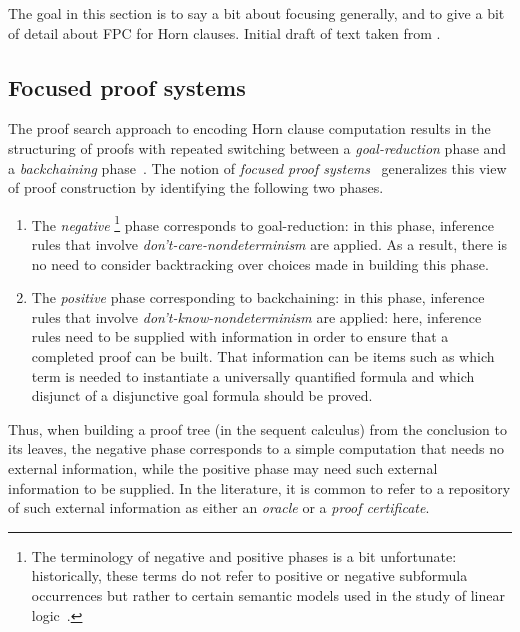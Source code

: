 \documentclass[a4paper,USenglish,cleveref, autoref, thm-restate]{lipics-v2019}
\begin{document}
{\color{red} The goal in this section is to say a bit about focusing
  generally, and to give a bit of detail about FPC for Horn clauses.
  Initial draft of text taken from \cite{blanco19ppdp}.
}

\subsection{Focused proof systems}
\label{ssec:focused}

The proof search approach to encoding Horn clause computation
results in the structuring of proofs with repeated
switching between a \emph{goal-reduction} phase and a
\emph{backchaining} phase~\cite{miller91apal}.
%
The notion of \emph{focused proof systems}~\cite{andreoli92jlc,liang09tcs}
generalizes this view of proof construction by identifying the
following two phases. %
\begin{enumerate}
\item The \emph{negative}%
\footnote{The terminology of negative and positive phases is a bit
  unfortunate: historically, these terms do not refer to positive or negative
  subformula occurrences but rather to certain semantic models used in
  the study of linear logic~\cite{girard87tcs}.}
%
  phase corresponds to  goal-reduction: in this phase,
  inference rules that involve \emph{don't-care-non\-de\-ter\-min\-ism} are
  applied.
%
  As a result, there is no need to consider backtracking over choices
  made in building this phase.

\item The \emph{positive} phase corresponding to  backchaining: in this phase, inference rules that involve
  \emph{don't-know-non\-de\-ter\-min\-ism} are applied: here,
  inference rules need to be supplied with information in order to
  ensure that a completed proof can be built.
%
  That information can be items such as which term is needed to
  instantiate a universally quantified formula and which disjunct of a
  disjunctive goal formula should be proved.
\end{enumerate}
%
Thus, when building a proof tree (in the sequent calculus) from the
conclusion to its leaves, the negative phase corresponds to a simple
computation that needs no external information, while the positive
phase may need such external information to be supplied.
%
In the literature, it is common to refer to a repository of such
external information as either an \emph{oracle} or a \emph{proof
certificate}.
\end{document}

